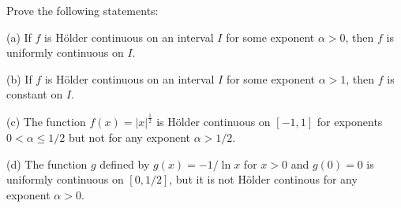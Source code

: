\documentclass[10pt]{article}
\newenvironment{problem}[2][Problem]{\begin{trivlist}
\item[\hskip \labelsep {\bfseries #1}\hskip \labelsep {\bfseries #2.}]}{\end{trivlist}}
\begin{document}
\begin{problem}{1.4.4}
Prove the following statements:

(a) If $f$ is H\"{o}lder continuous on an interval $I$ for some exponent $\alpha > 0$, then $f$ is uniformly continuous on $I$.

(b) If $f$ is H\"{o}lder continuous on an interval $I$ for some exponent $\alpha > 1$, then $f$ is constant on $I$.

(c) The function $f(x) = |x|^{\frac{1}{2}}$ is  H\"{o}lder continuous on $[-1,1]$ for exponents $0<\alpha\leq1/2$ but not for any exponent $\alpha >  1/2$.

(d) The function $g$ defined by $g(x) = -1/\ln x$ for $x > 0$ and $g(0) = 0$ is uniformly continuous on $[0,1/2]$, but it is not H\"{o}lder continous for any exponent $\alpha > 0$.
\end{problem}
\end{document}
